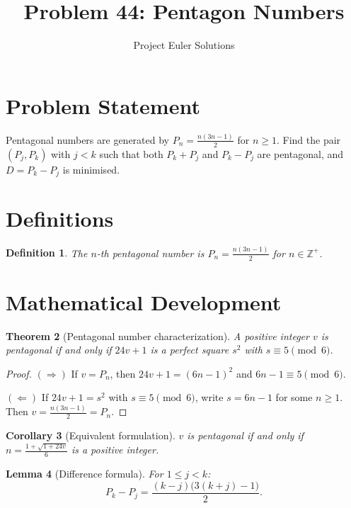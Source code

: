 \documentclass[12pt]{article}
\title{Problem 44: Pentagon Numbers}
\author{Project Euler Solutions}
\date{}
\newtheorem{theorem}{Theorem}
\newtheorem{lemma}[theorem]{Lemma}
\newtheorem{corollary}[theorem]{Corollary}
\newtheorem{definition}[theorem]{Definition}
\begin{document}
\maketitle

\section{Problem Statement}

Pentagonal numbers are generated by $P_n = \frac{n(3n-1)}{2}$ for $n \geq 1$. Find the pair $(P_j, P_k)$ with $j < k$ such that both $P_k + P_j$ and $P_k - P_j$ are pentagonal, and $D = P_k - P_j$ is minimised.

\section{Definitions}

\begin{definition}
The $n$-th \emph{pentagonal number} is $P_n = \frac{n(3n-1)}{2}$ for $n \in \mathbb{Z}^+$.
\end{definition}

\section{Mathematical Development}

\begin{theorem}[Pentagonal number characterization]
A positive integer $v$ is pentagonal if and only if $24v + 1$ is a perfect square $s^2$ with $s \equiv 5 \pmod{6}$.
\end{theorem}

\begin{proof}
$(\Rightarrow)$ If $v = P_n$, then $24v + 1 = (6n-1)^2$ and $6n - 1 \equiv 5 \pmod{6}$.

$(\Leftarrow)$ If $24v + 1 = s^2$ with $s \equiv 5 \pmod{6}$, write $s = 6n - 1$ for some $n \geq 1$. Then $v = \frac{n(3n-1)}{2} = P_n$.
\end{proof}

\begin{corollary}[Equivalent formulation]
$v$ is pentagonal if and only if $n = \frac{1 + \sqrt{1+24v}}{6}$ is a positive integer.
\end{corollary}

\begin{lemma}[Difference formula]
For $1 \leq j < k$:
\[
P_k - P_j = \frac{(k-j)\bigl(3(k+j) - 1\bigr)}{2}.
\]
\end{lemma}
\end{document}
